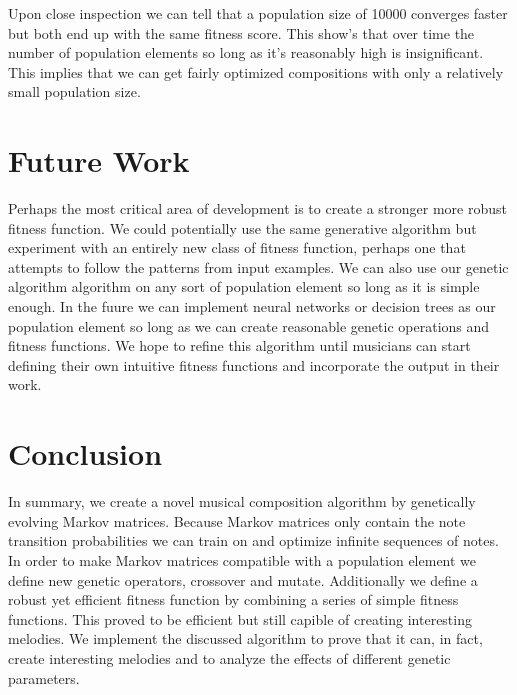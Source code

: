 \documentclass{article}
\begin{document}
Upon close inspection we can tell that a population size of 10000 converges faster but both end up with the same fitness score. This show's that over time the number of population elements so long as it's reasonably high is insignificant. This implies that we can get fairly optimized compositions with only a relatively small population size. 

\section{Future Work}

Perhaps the most critical area of development is to create a stronger more robust fitness function. We could potentially use the same generative algorithm but experiment with an entirely new class of fitness function, perhaps one that attempts to follow the patterns from input examples. We can also use our genetic algorithm algorithm on any sort of population element so long as it is simple enough. In the fuure we can implement neural networks or decision trees as our population element so long as we can create reasonable genetic operations and fitness functions. We hope to refine this algorithm until musicians can start defining their own intuitive fitness functions and incorporate the output in their work.

\section{Conclusion}

In summary, we create a novel musical composition algorithm by genetically evolving Markov matrices. Because Markov matrices only contain the note transition probabilities we can train on and optimize infinite sequences of notes. In order to make Markov matrices compatible with a population element we define new genetic operators, crossover and mutate. Additionally we define a robust yet efficient fitness function by combining a series of simple fitness functions. This proved to be efficient but still capible of creating interesting melodies. We implement the discussed algorithm to prove that it can, in fact, create interesting melodies and to analyze the effects of different genetic parameters.




\end{document}
